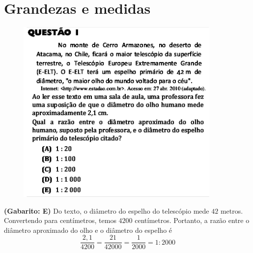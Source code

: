 \documentclass[a4paper]{article}
\begin{document}
\section{Grandezas e medidas}
\begin{figure}[H]
	\begin{center}
		\includegraphics[width=10cm]{L2Q1.png}
	\end{center}
\end{figure}
\par\textbf{(Gabarito: E)} Do texto, o diâmetro do espelho do telescópio mede $42$ metros. Convertendo para centímetros, temos $4200$ centímetros. Portanto, a razão entre o diâmetro aproximado do olho e o diâmetro do espelho é
\begin{equation*}
\frac{2,1}{4200} = \frac{21}{42000} = \frac{1}{2000} = 1:2000
\end{equation*}
\end{document}
